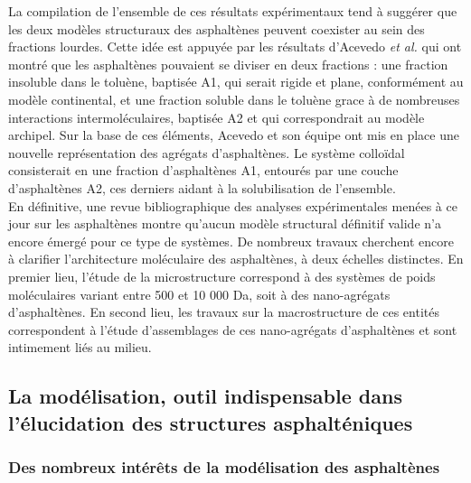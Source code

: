 \documentclass[12pt,a4paper]{book}
\begin{document}
La compilation de l'ensemble de ces résultats expérimentaux tend à suggérer que les deux modèles structuraux des asphaltènes peuvent coexister au sein des fractions lourdes. Cette idée est appuyée par les résultats d'Acevedo \textit{et al.} \cite{acevedo2004structural, gutierrez2001fractionation} qui ont montré que les asphaltènes pouvaient se diviser en deux fractions : une fraction insoluble dans le toluène, baptisée A1, qui serait rigide et plane, conformément au modèle continental, et une fraction soluble dans le toluène grace à de nombreuses interactions intermoléculaires, baptisée A2 et qui correspondrait au modèle archipel. Sur la base de ces éléments, Acevedo et son équipe ont mis en place une nouvelle représentation des agrégats d'asphaltènes. Le système colloïdal consisterait en une fraction d'asphaltènes A1, entourés par une couche d'asphaltènes A2, ces derniers aidant à la solubilisation de l'ensemble. \\
En définitive, une revue bibliographique des analyses expérimentales menées à ce jour sur les asphaltènes montre qu'aucun modèle structural définitif valide n'a encore émergé pour ce type de systèmes. De nombreux travaux cherchent encore à clarifier l'architecture moléculaire des asphaltènes, à deux échelles distinctes. En premier lieu, l'étude de la microstructure correspond à des systèmes de poids moléculaires variant entre 500 et 10 000 Da, soit à des nano-agrégats d'asphaltènes. En second lieu, les travaux sur la macrostructure de ces entités correspondent à l'étude d'assemblages de ces nano-agrégats d'asphaltènes et sont intimement liés au milieu. 



\subsection{La modélisation, outil indispensable dans l'élucidation des structures asphalténiques}

\subsubsection{Des nombreux intérêts de la modélisation des asphaltènes}
\end{document}
